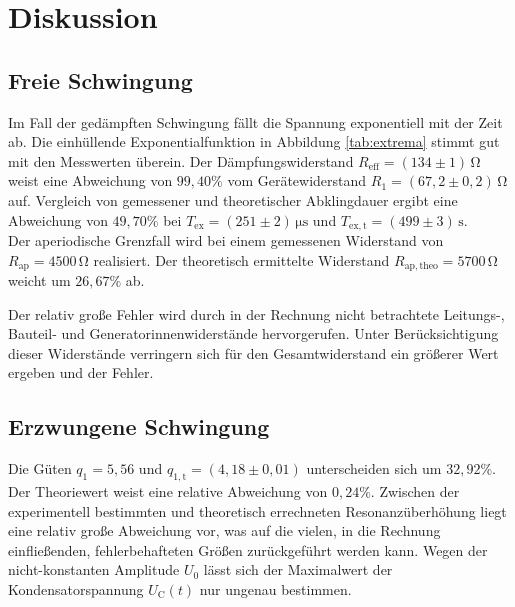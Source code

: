 \section{Diskussion}
\label{sec:Diskussion}
\subsection{Freie Schwingung}
Im Fall der gedämpften Schwingung fällt die Spannung exponentiell mit der Zeit ab. 
Die einhüllende Exponentialfunktion in Abbildung \ref{tab:extrema} stimmt gut mit den Messwerten überein. 
Der Dämpfungswiderstand $R_\mathup{eff}=(134\pm1)\,\si{\ohm}$ weist eine Abweichung von $99,40\%$ vom Gerätewiderstand $R_1=(67,2\pm0,2)\,\si{\ohm}$ auf.
Vergleich von gemessener und theoretischer Abklingdauer ergibt eine Abweichung von $49,70\%$ bei $T_\mathup{ex}=(251\pm2)\,\si{\micro\second}$ und $T_\mathup{ex,t}=(499\pm3)\,\si\second$. \\
Der aperiodische Grenzfall wird bei einem gemessenen Widerstand von $R_\mathup{ap}=4500\,\si\ohm$ realisiert. 
Der theoretisch ermittelte Widerstand $R_\mathup{ap,theo}=5700\,\si\ohm$ weicht um $26,67\%$ ab.

Der relativ große Fehler wird durch in der Rechnung nicht betrachtete Leitungs-, Bauteil- und Generatorinnenwiderstände hervorgerufen. 
Unter Berücksichtigung dieser Widerstände verringern sich für den Gesamtwiderstand ein größerer Wert ergeben und der Fehler.

\subsection{Erzwungene Schwingung}
Die Güten $q_1=5,56$ und $q_{1,\mathup{t}}=(4,18\pm0,01)$ unterscheiden sich um $32,92\%$. 
Der Theoriewert weist eine relative Abweichung von $0,24\%$.
Zwischen der experimentell bestimmten und theoretisch errechneten Resonanzüberhöhung liegt eine relativ große Abweichung vor, was auf die vielen, in die Rechnung einfließenden, fehlerbehafteten Größen zurückgeführt werden kann. 
Wegen der nicht-konstanten Amplitude $U_0$ lässt sich der Maximalwert der Kondensatorspannung $U_\mathup{C}(t)$ nur ungenau bestimmen. 

